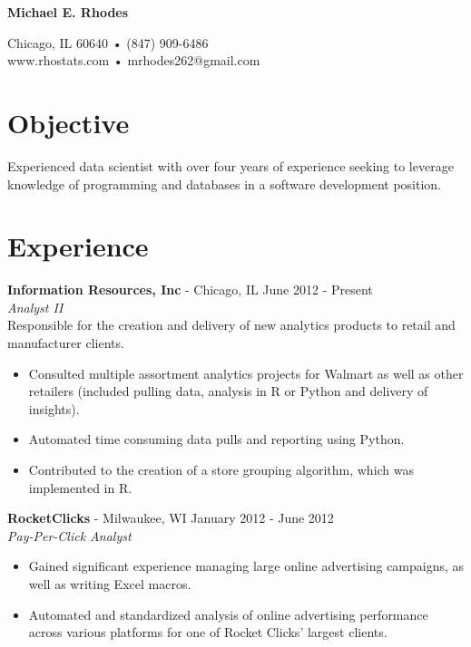 \documentclass[margin]{res}
\begin{document}
\begin{center}

\begin{large}
\textbf{Michael E. Rhodes}\\
\end{large}

Chicago, IL 60640 • (847) 909-6486\\
www.rhostats.com • mrhodes262@gmail.com \\[3pt]

\end{center}


\begin{resume}

\section{Objective} Experienced data scientist with over four years of experience seeking to leverage knowledge of programming and databases in a software development position.

\section{Experience}
 {\bf Information Resources, Inc} - Chicago, IL \hfill June 2012 - Present\\
 \textit{Analyst II}\\
 {Responsible for the creation and delivery of new analytics products to retail and manufacturer clients.}
 
 \begin{itemize} \itemsep -2pt  %
	\item Consulted multiple assortment analytics projects for Walmart as well as other retailers (included pulling data, analysis in R or Python and delivery of insights).
	\item Automated time consuming data pulls and reporting using Python.
 	\item Contributed to the creation of a store grouping algorithm, which was implemented in R.
 \end{itemize}
 
 {\bf RocketClicks} - Milwaukee, WI \hfill January 2012 - June 2012\\
 \textit{Pay-Per-Click Analyst}
 \begin{itemize} \itemsep -2pt
  	\item Gained significant experience managing large online advertising campaigns, as well as
writing Excel macros.
 	\item Automated and standardized analysis of online advertising performance across various
platforms for one of Rocket Clicks' largest clients.
 \end{itemize}
 

\end{resume}
\end{document}
